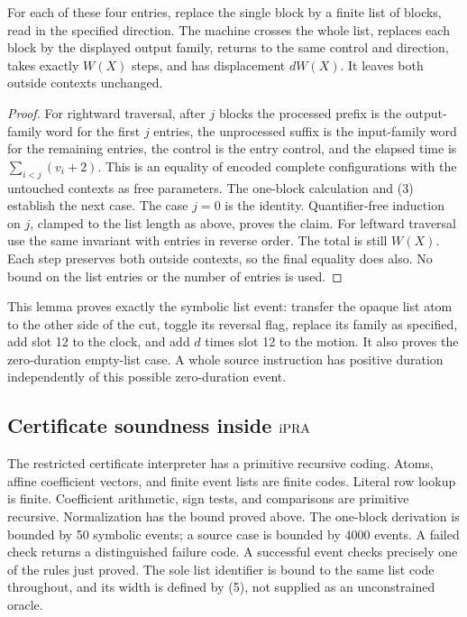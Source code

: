\begin{lemma}
For each of these four entries, replace the single block by a finite list
of blocks, read in the specified direction.  The machine crosses the
whole list, replaces each block by the displayed output family, returns
to the same control and direction, takes exactly $W(X)$ steps, and has
displacement $dW(X)$.  It leaves both outside contexts unchanged.
\end{lemma}

\begin{proof}
For rightward traversal, after $j$ blocks the processed prefix is the
output-family word for the first $j$ entries, the unprocessed suffix is
the input-family word for the remaining entries, the control is the
entry control, and the elapsed time is
$\sum_{i<j}(v_i+2)$.  This is an equality of encoded complete
configurations with the untouched contexts as free parameters.  The
one-block calculation and (3) establish the next case.  The case $j=0$
is the identity.  Quantifier-free induction on $j$, clamped to the list
length as above, proves the claim.  For leftward traversal use the same
invariant with entries in reverse order.  The total is still $W(X)$.
Each step preserves both outside contexts, so the final equality does
also.  No bound on the list entries or the number of entries is used.
\end{proof}

This lemma proves exactly the symbolic list event: transfer the opaque
list atom to the other side of the cut, toggle its reversal flag,
replace its family as specified, add slot 12 to the clock, and add
$d$ times slot 12 to the motion.  It also proves the zero-duration
empty-list case.  A whole source instruction has positive duration
independently of this possible zero-duration event.

\subsection{Certificate soundness inside \texorpdfstring{$\mathrm{iPRA}$}{iPRA}}

The restricted certificate interpreter has a primitive recursive coding.
Atoms, affine coefficient vectors, and finite event lists are finite
codes.  Literal row lookup is finite.  Coefficient arithmetic, sign tests,
and comparisons are primitive recursive.  Normalization has the bound
proved above.  The one-block derivation is bounded by 50 symbolic events;
a source case is bounded by 4000 events.  A failed check returns a
distinguished failure code.  A successful event checks precisely one
of the rules just proved.  The sole list identifier is bound to the same
list code throughout, and its width is defined by (5), not supplied as
an unconstrained oracle.

